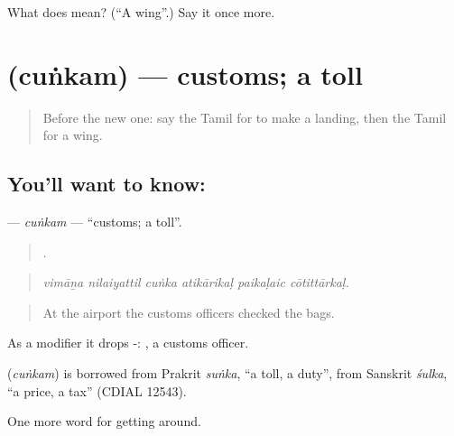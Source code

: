 \begin{tcolorbox}[breakable,colback=teal!4,colframe=teal!35!black,title={Before you move on}]
What does  mean? (\textquotedblleft{}A wing\textquotedblright{}.) Say it once more.
\end{tcolorbox}
\section[\texorpdfstring{\ta{சுங்கம்} (cuṅkam)}{சுங்கம் (cuṅkam)}]{ (cuṅkam) — customs; a toll}

\label{lesson:TA-C413-cunkam}



\begin{quote}
Before the new one: say the Tamil for to make a landing, then the Tamil for a wing.
\end{quote}

\subsection*{You'll want to know: }
\textbf{} — \emph{cuṅkam} — \textquotedblleft{}customs; a toll\textquotedblright{}.

\begin{quote}
     .
\end{quote}

\begin{quote}
\emph{vimāṉa nilaiyattil cuṅka atikārikaḷ paikaḷaic cōtittārkaḷ.}
\end{quote}

\begin{quote}
At the airport the customs officers checked the bags.
\end{quote}

As a modifier it drops -:  , a customs officer.

\begin{cousinweb}
\textbf{} (\emph{cuṅkam}) is borrowed from Prakrit \emph{suṅka}, \textquotedblleft{}a toll, a duty\textquotedblright{}, from Sanskrit \emph{śulka}, \textquotedblleft{}a price, a tax\textquotedblright{} (CDIAL 12543).
\end{cousinweb}

\begin{grammarlens}[title={What you've built}]
One more word for getting around.
\end{grammarlens}

